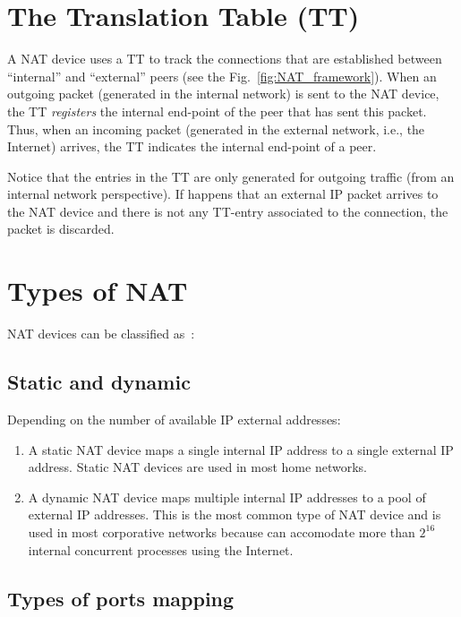 \section{The Translation Table (TT)}

A NAT device uses a TT to track the connections that are established
between ``internal'' and ``external'' peers (see the
Fig.~\ref{fig:NAT_framework}). When an outgoing packet (generated in
the internal network) is sent to the NAT device, the TT
\emph{registers} the internal end-point of the peer that has sent this
packet. Thus, when an incoming packet (generated in the external network,
i.e., the Internet) arrives, the TT indicates the internal end-point
of a peer.

Notice that the entries in the TT are only generated for outgoing
traffic (from an internal network perspective). If happens that
an external IP packet arrives to the NAT device and there is not any
TT-entry associated to the connection, the packet is discarded.

\section{Types of NAT}

NAT devices can be classified as~\cite{jennings2007network}:

\subsection{Static and dynamic}

Depending on the number of available IP external addresses:

\begin{enumerate}
\item A static NAT device maps a single internal IP address to a
  single external IP address. Static NAT devices are used in most home
  networks.
\item A dynamic NAT device maps multiple internal IP addresses to a
  pool of external IP addresses. This is the most common type of NAT
  device and is used in most corporative networks because can
  accomodate more than $2^{16}$ internal concurrent processes using
  the Internet.
\end{enumerate}

\subsection{Types of ports mapping}


